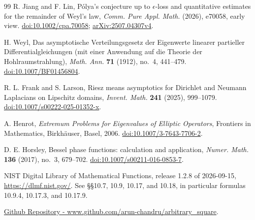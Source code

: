 \documentclass[11pt,reqno]{amsart}
\numberwithin{equation}{section}
\begin{document}
\begin{thebibliography}{99}
R. Jiang and F. Lin,
P\'olya's conjecture up to $\epsilon$-loss and quantitative estimates
for the remainder of Weyl's law,
\emph{Comm. Pure Appl. Math.} (2026), e70058, early view.
\href{https://doi.org/10.1002/cpa.70058}{doi:10.1002/cpa.70058};
\href{https://arxiv.org/abs/2507.04307v4}{arXiv:2507.04307v4}.

H. Weyl,
Das asymptotische Verteilungsgesetz der Eigenwerte linearer partieller
Differentialgleichungen (mit einer Anwendung auf die Theorie der Hohlraumstrahlung),
\emph{Math. Ann.} \textbf{71} (1912), no.~4, 441--479.
\href{https://doi.org/10.1007/BF01456804}{doi:10.1007/BF01456804}.

R. L. Frank and S. Larson,
Riesz means asymptotics for Dirichlet and Neumann Laplacians on Lipschitz domains,
\emph{Invent. Math.} \textbf{241} (2025), 999--1079.
\href{https://doi.org/10.1007/s00222-025-01352-x}{doi:10.1007/s00222-025-01352-x}.

A. Henrot,
\emph{Extremum Problems for Eigenvalues of Elliptic Operators},
Frontiers in Mathematics, Birkh\"auser, Basel, 2006.
\href{https://doi.org/10.1007/3-7643-7706-2}{doi:10.1007/3-7643-7706-2}.

D. E. Horsley,
Bessel phase functions: calculation and application,
\emph{Numer. Math.} \textbf{136} (2017), no.~3, 679--702.
\href{https://doi.org/10.1007/s00211-016-0853-7}{doi:10.1007/s00211-016-0853-7}.

NIST Digital Library of Mathematical Functions,
release 1.2.8 of 2026-09-15,
\url{https://dlmf.nist.gov/}.
See \S\S10.7, 10.9, 10.17, and 10.18, in particular formulas
10.9.4, 10.17.3, and 10.17.9.

\href{https://github.com/arun-chandru/arbitrary_square}{Github Repository - www.github.com/arun-chandru/arbitrary\_square}.

\end{thebibliography}
\end{document}
